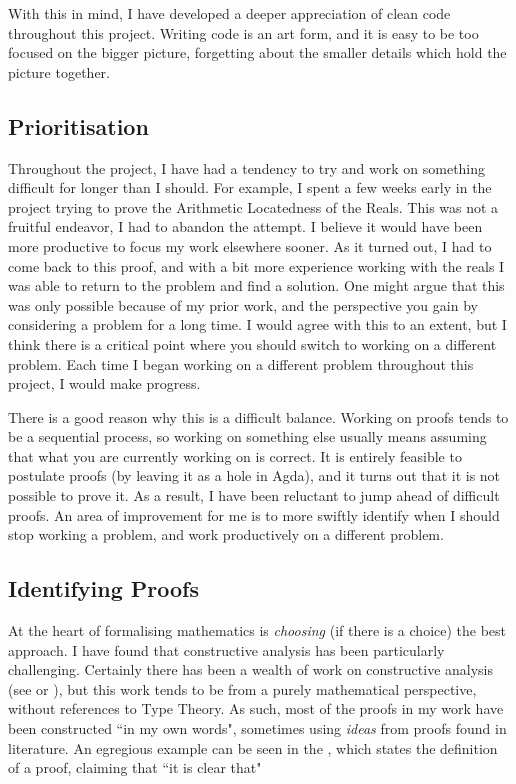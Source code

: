 \documentclass[ProjectReport]{subfiles}
\begin{document}
With this in mind, I have developed a deeper appreciation of clean code throughout this project. Writing code is an art form, and it is easy to be too focused on the bigger picture, forgetting about the smaller details which hold the picture together.

\subsection{Prioritisation}

Throughout the project, I have had a tendency to try and work on something difficult for longer than I should. For example, I spent a few weeks early in the project trying to prove the Arithmetic Locatedness of the Reals. This was not a fruitful endeavor, I had to abandon the attempt. I believe it would have been more productive to focus my work elsewhere sooner. As it turned out, I had to come back to this proof, and with a bit more experience working with the reals I was able to return to the problem and find a solution. 
One might argue that this was only possible because of my prior work, and the perspective you gain by considering a problem for a long time. I would agree with this to an extent, but I think there is a critical point where you should switch to working on a different problem. Each time I began working on a different problem throughout this project, I would make progress. 

There is a good reason why this is a difficult balance. Working on proofs tends to be a sequential process, so working on something else usually means assuming that what you are currently working on is correct. It is entirely feasible to postulate proofs (by leaving it as a hole in Agda), and it turns out that it is not possible to prove it. As a result, I have been reluctant to jump ahead of difficult proofs. An area of improvement for me is to more swiftly identify when I should stop working a problem, and work productively on a different problem.

\subsection{Identifying Proofs}

At the heart of formalising mathematics is \textit{choosing} (if there is a choice) the best approach. I have found that constructive analysis has been particularly challenging. Certainly there has been a wealth of work on constructive analysis (see \cite{troelstra1988constructivism} or \cite{Bishop1987-BISCA-2}), but this work tends to be from a purely mathematical perspective, without references to Type Theory. As such, most of the proofs in my work have been constructed ``in my own words", sometimes using \textit{ideas} from proofs found in literature. An egregious example can be seen in the \cite[TODO : CITE PROPERLY]{hottbook}, which states the definition of a proof, claiming that ``it is clear that"
\end{document}
